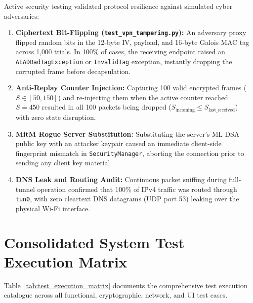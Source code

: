 Active security testing validated protocol resilience against simulated cyber adversaries:
\begin{enumerate}
    \item \textbf{Ciphertext Bit-Flipping (\texttt{test\_vpn\_tampering.py}):} An adversary proxy flipped random bits in the 12-byte IV, payload, and 16-byte Galois MAC tag across 1,000 trials. In 100\% of cases, the receiving endpoint raised an \texttt{AEADBad}\allowbreak\texttt{TagException} or \texttt{InvalidTag} exception, instantly dropping the corrupted frame before decapsulation.
    \item \textbf{Anti-Replay Counter Injection:} Capturing 100 valid encrypted frames ($S \in [50, 150]$) and re-injecting them when the active counter reached $S = 450$ resulted in all 100 packets being dropped ($S_{\text{incoming}} \le S_{\text{last\_received}}$) with zero state disruption.
    \item \textbf{MitM Rogue Server Substitution:} Substituting the server's ML-DSA public key with an attacker keypair caused an immediate client-side fingerprint mismatch in \texttt{SecurityManager}, aborting the connection prior to sending any client key material.
    \item \textbf{DNS Leak and Routing Audit:} Continuous packet sniffing during full-tunnel operation confirmed that 100\% of IPv4 traffic was routed through \texttt{tun0}, with zero cleartext DNS datagrams (UDP port 53) leaking over the physical Wi-Fi interface.
\end{enumerate}

\section{Consolidated System Test Execution Matrix}
\label{sec:test_execution_matrix_sec}

Table~\ref{tab:test_execution_matrix} documents the comprehensive test execution catalogue across all functional, cryptographic, network, and UI test cases.

